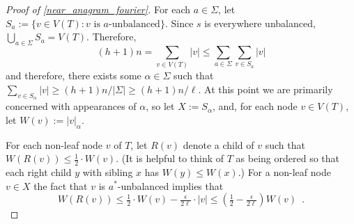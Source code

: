 \documentclass{patmorin}
\begin{document}
\begin{proof}[Proof of \cref{near_anagram_fourier}]


  For each $a\in\Sigma$, let $S_a:=\{v\in V(T): \text{$v$ is $a$-unbalanced}\}$. Since $s$ is everywhere unbalanced, $\bigcup_{a\in\Sigma} S_a=V(T)$. Therefore,
  \[
     (h+1)n = \sum_{v\in V(T)}|v|\le \sum_{a\in\Sigma} \sum_{v\in S_a} |v|
  \]
  and therefore, there exists some $\alpha\in\Sigma$ such that $\sum_{v\in S_{\alpha}}|v|\ge (h+1)n/|\Sigma| \ge (h+1)n/\ell$.   At this point we are primarily concerned with appearances of $\alpha$, so let $X:=S_{\alpha}$, and, for each node $v\in V(T)$, let $W(v):= |v|_{\alpha}$.

  For each non-leaf node $v$ of $T$, let $R(v)$ denote a child of $v$ such that $W(R(v))\le \tfrac12\cdot W(v)$.  (It is helpful to think of $T$ as being ordered so that each right child $y$ with sibling $x$ has $W(y)\le W(x)$.)  For a non-leaf node $v\in X$ the fact that $v$ is $a^*$-unbalanced implies that
  \[  W(R(v)) \le \tfrac{1}{2}\cdot W(v) - \tfrac{\epsilon}{2\ell}\cdot |v|
      \le (\tfrac12-\tfrac{\epsilon}{2\ell})W(v) \enspace .
  \]


\end{proof}
\end{document}
